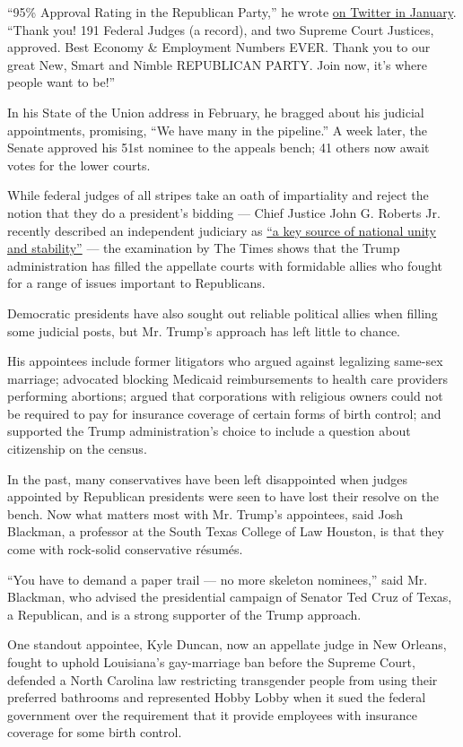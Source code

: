 ``95\% Approval Rating in the Republican Party,'' he wrote
\href{https://twitter.com/realdonaldtrump/status/1221469014427348992?lang=en}{on
Twitter in January}. ``Thank you! 191 Federal Judges (a record), and two
Supreme Court Justices, approved. Best Economy \& Employment Numbers
EVER. Thank you to our great New, Smart and Nimble REPUBLICAN PARTY.
Join now, it's where people want to be!''

In his State of the Union address in February, he bragged about his
judicial appointments, promising, ``We have many in the pipeline.'' A
week later, the Senate approved his 51st nominee to the appeals bench;
41 others now await votes for the lower courts.

While federal judges of all stripes take an oath of impartiality and
reject the notion that they do a president's bidding --- Chief Justice
John G. Roberts Jr. recently described an independent judiciary as
\href{https://www.supremecourt.gov/publicinfo/year-end/2019year-endreport.pdf}{``a
key source of national unity and stability''} --- the examination by The
Times shows that the Trump administration has filled the appellate
courts with formidable allies who fought for a range of issues important
to Republicans.

Democratic presidents have also sought out reliable political allies
when filling some judicial posts, but Mr. Trump's approach has left
little to chance.

His appointees include former litigators who argued against legalizing
same-sex marriage; advocated blocking Medicaid reimbursements to health
care providers performing abortions; argued that corporations with
religious owners could not be required to pay for insurance coverage of
certain forms of birth control; and supported the Trump administration's
choice to include a question about citizenship on the census.

In the past, many conservatives have been left disappointed when judges
appointed by Republican presidents were seen to have lost their resolve
on the bench. Now what matters most with Mr. Trump's appointees, said
Josh Blackman, a professor at the South Texas College of Law Houston, is
that they come with rock-solid conservative résumés.

``You have to demand a paper trail --- no more skeleton nominees,'' said
Mr. Blackman, who advised the presidential campaign of Senator Ted Cruz
of Texas, a Republican, and is a strong supporter of the Trump approach.

One standout appointee, Kyle Duncan, now an appellate judge in New
Orleans, fought to uphold Louisiana's gay-marriage ban before the
Supreme Court, defended a North Carolina law restricting transgender
people from using their preferred bathrooms and represented Hobby Lobby
when it sued the federal government over the requirement that it provide
employees with insurance coverage for some birth control.


